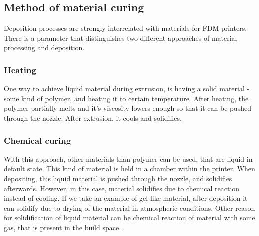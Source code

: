 \documentclass[a4paper, 11pt, reqno]{report}
\begin{document}
\subsection{Method of material curing}
Deposition processes are strongly interrelated with materials for FDM printers. There is a parameter that distinguishes two different approaches of material processing and deposition.
\subsubsection{Heating}
One way to achieve liquid material during extrusion, is having a solid material - some kind of polymer, and heating it to certain temperature. After heating, the polymer partially melts and it's viscosity lowers enough so that it can be pushed through the nozzle. After extrusion, it cools and solidifies.
\subsubsection{Chemical curing}
With this approach, other materials than polymer can be used, that are liquid in default state. This kind of material is held in a chamber within the printer. When depositing, this liquid material is pushed through the nozzle, and solidifies afterwards. However, in this case, material solidifies due to chemical reaction instead of cooling. If we take an example of gel-like material, after deposition it can solidify due to drying of the material in atmospheric conditions. Other reason for solidification of liquid material can be chemical reaction of material with some gas, that is present in the build space.
%
\end{document}
